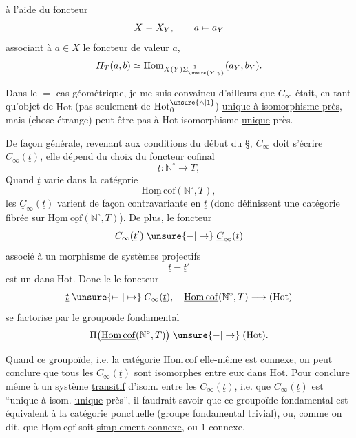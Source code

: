 à l'aide du  foncteur
\[
X\mathrel{-}X_Y,\qquad a\mathrel{\mapstochar\relbar}a_Y
\]
associant à  $a\in X$ le foncteur \uline{}  de valeur $a$,    
\[
H_T(a,b)\simeq\mathrm{Hom}_{X(Y)\Sigma_{\unsure{Y|y}}^{-1}}(a_Y,b_Y).
\]

Dans le $=$ cas géométrique, je me suis convaincu d'ailleurs que $C_\infty$ était, en tant qu'objet de $\mathrm{Hot}$ (pas seulement de $\mathrm{Hot}_0^{\unsure{\wedge|1}}$) \uline{unique à isomorphisme près}, mais (chose étrange) peut-être pas à $\mathrm{Hot}$-isomorphisme \uline{unique} près.

De façon générale, revenant aux conditions du début du \S, $C_\infty$ doit s'écrire $C_\infty(\underline t)$, elle dépend du choix du foncteur cofinal
\[
\underline t:\mathbb N^\circ\longrightarrow T,
\]
Quand $\underline t$ varie dans la catégorie
\[
\underline{\mathrm{Hom\,cof}}(\mathbb N^\circ,T),
\]
les $\underline C_\infty(\underline t)$ varient de façon contravariante en $\underline t$ (donc définissent une catégorie fibrée sur $\underline{\mathrm{Hom}}\ \underline{\mathrm{cof}}(\mathbb N^\circ,T)$). De plus, le foncteur
\[
C_\infty(\underline t')\mathrel{\unsure{-|\to}}\underline C_\infty(\underline t)
\]
associé à un morphisme de systèmes projectifs
\[
\underline t\mathrel{-}\underline t'
\]
est un  dans \uline{$\mathrm{Hot}$}. Donc  le
le foncteur
\[
\underline t\mathrel{\unsure{\mapstochar\relbar|\mapsto}}C_\infty(\underline t),\quad
\underline{\mathrm{Hom\,cof}}(\mathbb N^\circ,T)\longrightarrow(\mathrm{Hot})
\]
se factorise par le groupoïde fondamental
\[
\Pi\bigl(\underline{\mathrm{Hom\,cof}}(\mathbb N^\circ,T)\bigr)\mathrel{\unsure{-|\to}}(\mathrm{Hot}).
\]

Quand ce groupoïde, i.e.  la catégorie $\underline{\mathrm{Hom\,cof}}$ elle-même est connexe, on peut  conclure que tous les $C_\infty(\underline t)$ sont isomorphes entre eux dans $\mathrm{Hot}$. Pour conclure même à un système \uline{transitif} d'isom. entre les $C_\infty(\underline t)$, i.e. que $C_\infty(\underline t)$ est ``unique à isom. \uline{unique} près'', il faudrait savoir  que ce groupoïde fondamental est  équivalent à la catégorie ponctuelle (groupe fondamental trivial), ou, comme on dit, que $\underline{\mathrm{Hom}}\ \underline{\mathrm{cof}}$ soit \uline{simplement connexe}, ou $1$-connexe.

